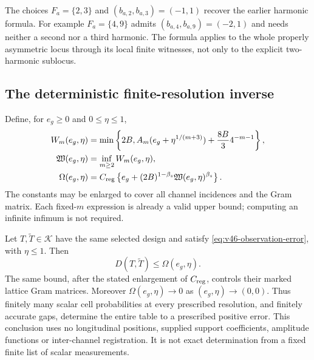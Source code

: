 The choices $F_a=\{2,3\}$ and $(b_{a,2},b_{a,3})=(-1,1)$ recover the
earlier harmonic formula.  For example $F_a=\{4,9\}$ admits
$(b_{a,4},b_{a,9})=(-2,1)$ and needs neither a second nor a third harmonic.
The formula applies to the whole properly asymmetric locus through its
local finite witnesses, not only to the explicit two-harmonic sublocus.

\subsection{The deterministic finite-resolution inverse}

Define, for $e_g\ge0$ and $0\le\eta\le1$,
\begin{align}
 W_m(e_g,\eta)&=\min\left\{2B,
 A_m(e_g+\eta^{1/(m+3)})+\frac{8B}{3}4^{-m-1}\right\},\nonumber\\
 \mathfrak W(e_g,\eta)&=\inf_{m\ge2}W_m(e_g,\eta),
       \label{eq:v46-modulus}\\
 \Omega(e_g,\eta)&=C_{\rm reg}\left\{e_g+
              (2B)^{1-\beta_s}\mathfrak W(e_g,\eta)^{\beta_s}\right\}.
              \nonumber
\end{align}
The constants may be enlarged to cover all channel incidences and the Gram
matrix.  Each fixed-$m$ expression is already a valid upper bound; computing
an infinite infimum is not required.

\begin{theorem}
\label{thm:v46-quantized-inverse}
Let $T,\widetilde T\in\mathcal K$ have the same selected design and satisfy
\eqref{eq:v46-observation-error}, with $\eta\le1$.  Then
\begin{equation}\label{eq:v46-main-bound}
 D(T,\widetilde T)\le\Omega(e_g,\eta).
\end{equation}
The same bound, after the stated enlargement of $C_{\rm reg}$, controls
their marked lattice Gram matrices.  Moreover
$\Omega(e_g,\eta)\longrightarrow0$ as $(e_g,\eta)\longrightarrow(0,0)$.
Thus finitely many scalar cell probabilities at every prescribed resolution,
and finitely accurate gaps, determine the entire table to a prescribed
positive error.  This conclusion uses no longitudinal positions, supplied
support coefficients, amplitude functions or inter-channel registration.
It is not exact determination from a fixed finite list of scalar measurements.
\end{theorem}

